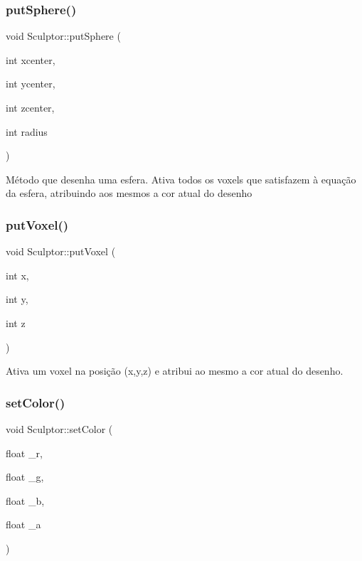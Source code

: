 \subsubsection{\texorpdfstring{putSphere()}{putSphere()}}
{\footnotesize\ttfamily void Sculptor\+::put\+Sphere (\begin{DoxyParamCaption}\item[{int}]{xcenter,  }\item[{int}]{ycenter,  }\item[{int}]{zcenter,  }\item[{int}]{radius }\end{DoxyParamCaption})}

Método que desenha uma esfera. Ativa todos os voxels que satisfazem à equação da esfera, atribuindo aos mesmos a cor atual do desenho \mbox{\label{classSculptor_a4bdea3048b419d58e93074060eaa7b52}} 
\subsubsection{\texorpdfstring{putVoxel()}{putVoxel()}}
{\footnotesize\ttfamily void Sculptor\+::put\+Voxel (\begin{DoxyParamCaption}\item[{int}]{x,  }\item[{int}]{y,  }\item[{int}]{z }\end{DoxyParamCaption})}

Ativa um voxel na posição (x,y,z) e atribui ao mesmo a cor atual do desenho. \mbox{\label{classSculptor_a5723e671e073ac310b6f385a7fdc9f9f}} 
\subsubsection{\texorpdfstring{setColor()}{setColor()}}
{\footnotesize\ttfamily void Sculptor\+::set\+Color (\begin{DoxyParamCaption}\item[{float}]{\+\_\+r,  }\item[{float}]{\+\_\+g,  }\item[{float}]{\+\_\+b,  }\item[{float}]{\+\_\+a }\end{DoxyParamCaption})}

